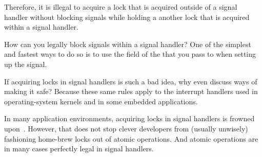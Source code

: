 	Therefore, it is illegal to acquire a lock that is acquired outside
	of a signal handler without blocking signals while holding
	a another lock that is acquired within a signal handler.

\QuickQ{}
	How can you legally block signals within a signal handler?
\QuickA{}
	One of the simplest and fastest ways to do so is to use
	the  field of the  that
	you pass to  when setting up the signal.

\QuickQ{}
	If acquiring locks in signal handlers is such a bad idea, why
	even discuss ways of making it safe?
\QuickA{}
	Because these same rules apply to the interrupt handlers used in
	operating-system kernels and in some embedded applications.

	In many application environments, acquiring locks in signal
	handlers is frowned upon~\cite{OpenGroup1997pthreads}.
	However, that does not stop clever developers from (usually
	unwisely) fashioning home-brew locks out of atomic operations.
	And atomic operations are in many cases perfectly legal in
	signal handlers.

